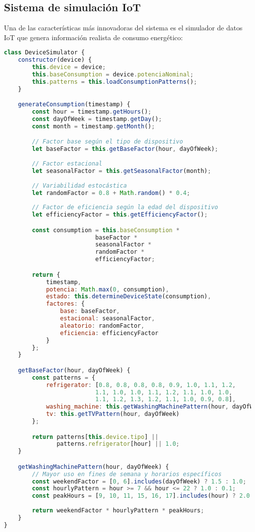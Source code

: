 \subsection{Sistema de simulación IoT}

Una de las características más innovadoras del sistema es el simulador de datos IoT que genera información realista de consumo energético:

\begin{lstlisting}[language=JavaScript, caption=Simulador de dispositivos IoT]
class DeviceSimulator {
    constructor(device) {
        this.device = device;
        this.baseConsumption = device.potenciaNominal;
        this.patterns = this.loadConsumptionPatterns();
    }

    generateConsumption(timestamp) {
        const hour = timestamp.getHours();
        const dayOfWeek = timestamp.getDay();
        const month = timestamp.getMonth();

        // Factor base según el tipo de dispositivo
        let baseFactor = this.getBaseFactor(hour, dayOfWeek);
        
        // Factor estacional
        let seasonalFactor = this.getSeasonalFactor(month);
        
        // Variabilidad estocástica
        let randomFactor = 0.8 + Math.random() * 0.4;
        
        // Factor de eficiencia según la edad del dispositivo
        let efficiencyFactor = this.getEfficiencyFactor();

        const consumption = this.baseConsumption * 
                          baseFactor * 
                          seasonalFactor * 
                          randomFactor * 
                          efficiencyFactor;

        return {
            timestamp,
            potencia: Math.max(0, consumption),
            estado: this.determineDeviceState(consumption),
            factores: {
                base: baseFactor,
                estacional: seasonalFactor,
                aleatorio: randomFactor,
                eficiencia: efficiencyFactor
            }
        };
    }

    getBaseFactor(hour, dayOfWeek) {
        const patterns = {
            refrigerator: [0.8, 0.8, 0.8, 0.8, 0.9, 1.0, 1.1, 1.2,
                          1.1, 1.0, 1.0, 1.1, 1.2, 1.1, 1.0, 1.0,
                          1.1, 1.2, 1.3, 1.2, 1.1, 1.0, 0.9, 0.8],
            washing_machine: this.getWashingMachinePattern(hour, dayOfWeek),
            tv: this.getTVPattern(hour, dayOfWeek)
        };

        return patterns[this.device.tipo] || 
               patterns.refrigerator[hour] || 1.0;
    }

    getWashingMachinePattern(hour, dayOfWeek) {
        // Mayor uso en fines de semana y horarios específicos
        const weekendFactor = [0, 6].includes(dayOfWeek) ? 1.5 : 1.0;
        const hourlyPattern = hour >= 7 && hour <= 22 ? 1.0 : 0.1;
        const peakHours = [9, 10, 11, 15, 16, 17].includes(hour) ? 2.0 : 1.0;
        
        return weekendFactor * hourlyPattern * peakHours;
    }
}
\end{lstlisting}

